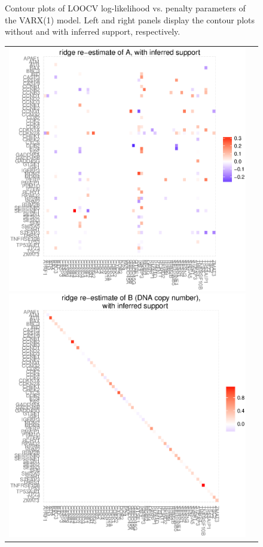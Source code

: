 \begin{figure}[h!]
\begin{tabular}{cc}
\end{tabular}
\caption{Contour plots of LOOCV log-likelihood vs. penalty parameters of the VARX(1) model. Left and right panels display the contour plots without and with inferred support, respectively.}
\label{fig:contourVARX}
\end{figure}


\begin{figure}[h!]
\centering
\begin{tabular}{cc}
\includegraphics[scale=0.28]{Figure_16a.eps}
\includegraphics[scale=0.28]{Figure_16b.eps}

\end{tabular}
\end{figure}
